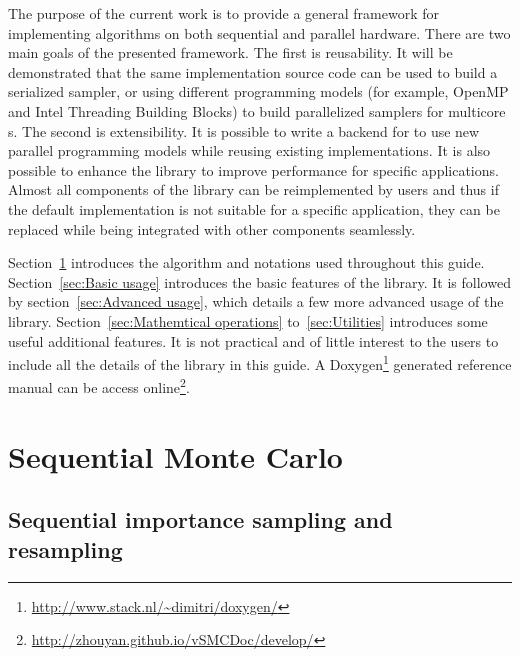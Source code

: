 \documentclass[11pt,bib,mint,hyper,altcolor]{marticle}
\def\version{develop}
\begin{document}
The purpose of the current work is to provide a general framework for
implementing \smc algorithms on both sequential and parallel hardware. There
are two main goals of the presented framework. The first is reusability. It
will be demonstrated that the same implementation source code can be used to
build a serialized sampler, or using different programming models (for example,
OpenMP and Intel Threading Building Blocks) to build parallelized samplers for
multicore \cpu{}s. The second is extensibility. It is possible to write a
backend for \vsmc to use new parallel programming models while reusing existing
implementations. It is also possible to enhance the library to improve
performance for specific applications. Almost all components of the library can
be reimplemented by users and thus if the default implementation is not
suitable for a specific application, they can be replaced while being
integrated with other components seamlessly.

Section~\ref{sec:Sequential Monte Carlo} introduces the \smc algorithm and
notations used throughout this guide. Section~\ref{sec:Basic usage} introduces
the basic features of the library. It is followed by section~\ref{sec:Advanced
  usage}, which details a few more advanced usage of the library.
Section~\ref{sec:Mathemtical operations} to~\ref{sec:Utilities} introduces some
useful additional features. It is not practical and of little interest to the
users to include all the details of the library in this guide. A
Doxygen\footnote{\url{http://www.stack.nl/~dimitri/doxygen/}} generated
reference manual can be access
online\footnote{\url{http://zhouyan.github.io/vSMCDoc/\version/}}.

\section{Sequential Monte Carlo}
\label{sec:Sequential Monte Carlo}

\subsection{Sequential importance sampling and resampling}
\label{sub:Sequential importance sampling and resampling}
\end{document}
